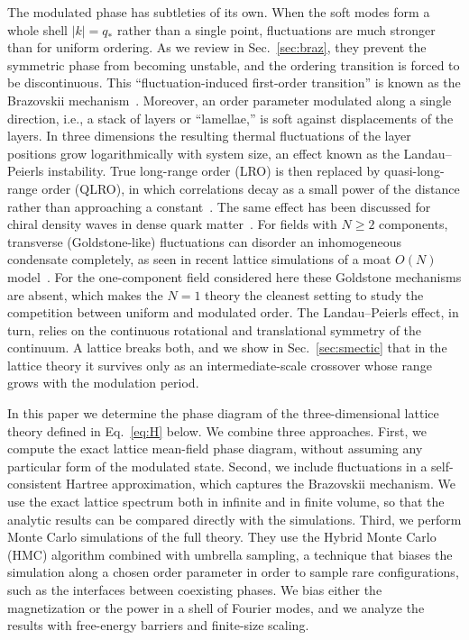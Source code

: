 \documentclass[aps,prd,twocolumn,superscriptaddress,nofootinbib,10pt]{revtex4-2}
\newcommand{\qs}{q_*}
\newcommand{\pending}[1]{\par\noindent{\color{gray}\small[\emph{Pending:} #1]}\par}
\begin{document}
The modulated phase has subtleties of its own.  When the soft modes form a
whole shell $|k|=\qs$ rather than a single point, fluctuations are much
stronger than for uniform ordering.  As we review in
Sec.~\ref{sec:braz}, they prevent the symmetric phase from becoming unstable,
and the ordering transition is forced to be discontinuous.  This
``fluctuation-induced first-order transition'' is known as the Brazovskii
mechanism~\cite{Brazovskii1975,Swift1977,Fredrickson1987,Hohenberg1995}.
Moreover, an order parameter modulated along a single direction, i.e., a stack
of layers or ``lamellae,'' is soft against displacements of the layers.  In
three dimensions the resulting thermal fluctuations of the layer positions
grow logarithmically with system size, an effect known as the Landau--Peierls
instability.  True long-range order (LRO) is then replaced by
quasi-long-range order (QLRO), in which correlations decay as a small power of
the distance rather than approaching a constant~\cite{Chaikin1995,
Grinstein1981,Grinstein1982}.  The same effect has been discussed for chiral
density waves in dense quark matter~\cite{Hidaka2015,Lee2015,Pisarski2019}.
For fields with $N\ge2$ components, transverse (Goldstone-like) fluctuations
can disorder an inhomogeneous condensate completely, as seen in recent lattice
simulations of a moat $O(N)$ model~\cite{Pisarski2020,Winstel2024}.  For the
one-component field considered here these Goldstone mechanisms are absent,
which makes the $N=1$ theory the cleanest setting to study the competition
between uniform and modulated order.  The Landau--Peierls effect, in turn,
relies on the continuous rotational and translational symmetry of the
continuum.  A lattice breaks both, and we show in Sec.~\ref{sec:smectic}
that in the lattice theory it survives only as an intermediate-scale
crossover whose range grows with the modulation period.

In this paper we determine the phase diagram of the three-dimensional lattice
theory defined in Eq.~\eqref{eq:H} below.  We combine three approaches.
First, we compute the exact lattice mean-field phase diagram, without assuming
any particular form of the modulated state.  Second, we include fluctuations
in a self-consistent Hartree approximation, which captures the Brazovskii
mechanism.  We use the exact lattice spectrum both in infinite and in finite
volume, so that the analytic results can be compared directly with the
simulations.  Third, we perform Monte Carlo simulations of the full theory.
They use the Hybrid Monte Carlo (HMC) algorithm combined with umbrella
sampling, a technique that biases the simulation along a chosen order
parameter in order to sample rare configurations, such as the interfaces
between coexisting phases.  We bias either the magnetization or the power in a
shell of Fourier modes, and we analyze the results with free-energy barriers
and finite-size scaling.
\pending{Summary of main results.}
\end{document}
